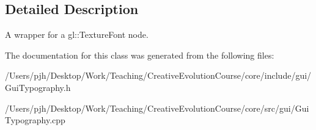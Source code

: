 \subsection{Detailed Description}
A wrapper for a gl\-::\-Texture\-Font node. 

The documentation for this class was generated from the following files\-:\begin{DoxyCompactItemize}
\item 
/\-Users/pjh/\-Desktop/\-Work/\-Teaching/\-Creative\-Evolution\-Course/core/include/gui/Gui\-Typography.\-h\item 
/\-Users/pjh/\-Desktop/\-Work/\-Teaching/\-Creative\-Evolution\-Course/core/src/gui/Gui\-Typography.\-cpp\end{DoxyCompactItemize}
